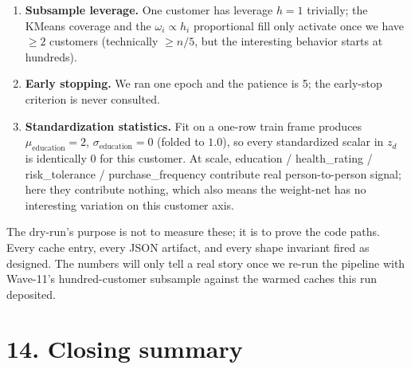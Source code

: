 \documentclass[11pt,a4paper]{article}
\begin{document}
\begin{enumerate}
\item \textbf{Subsample leverage.} One customer has leverage $h = 1$
trivially; the KMeans coverage and the $\omega_i \propto h_i$
proportional fill only activate once we have $\geq 2$ customers
(technically $\geq n/5$, but the interesting behavior starts at
hundreds).

\item \textbf{Early stopping.} We ran one epoch and the patience is 5;
the early-stop criterion is never consulted.

\item \textbf{Standardization statistics.} Fit on a one-row train
frame produces $\mu_{\text{education}} = 2$,
$\sigma_{\text{education}} = 0$ (folded to $1.0$), so every
standardized scalar in $z_d$ is identically $0$ for this customer. At
scale, education / health\_rating / risk\_tolerance /
purchase\_frequency contribute real person-to-person signal; here they
contribute nothing, which also means the weight-net has no interesting
variation on this customer axis.
\end{enumerate}

The dry-run's purpose is not to measure these; it is to prove the code
paths. Every cache entry, every JSON artifact, and every shape
invariant fired as designed. The numbers will only tell a real story
once we re-run the pipeline with Wave-11's hundred-customer subsample
against the warmed caches this run deposited.

\section*{14. Closing summary}
\end{document}
